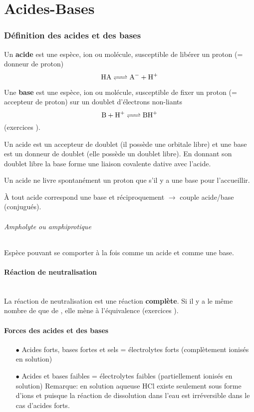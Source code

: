 \part{Acides-Bases}
\section{Définition des acides et des bases}



Un \textbf{acide} est une espèce,
ion ou molécule,
susceptible de libérer un proton  (= donneur de proton)
\[ \ce{HA <=> A- + H+} \]

Une \textbf{base} est une espèce, ion ou molécule,
susceptible de fixer un proton  (= accepteur de proton) sur un doublet d'électrons non-liants
\[ \ce{B + H+ <=> BH+} \]
(exercices \cite[p.~6]{godard}).

Un acide est un accepteur de doublet (il possède une orbitale libre) et une base est un donneur de doublet (elle possède un doublet libre).
En donnant son doublet libre la base forme une liaison covalente dative avec l'acide.

Un acide ne livre spontanément un proton que s'il y a une base pour l'accueillir.

À tout acide correspond une base et réciproquement $\rightarrow$ couple acide/base (conjugués).

\paragraph{Ampholyte ou amphiprotique}
Espèce pouvant se comporter à la fois comme un acide et comme une base.

\subsection{Réaction de neutralisation}

\\

La réaction de neutralisation est une réaction \textbf{complète}.
Si il y a le même nombre de  que de ,
elle mène à l'équivalence (exercices \cite[p.~4]{godard}).

\subsection{Forces des acides et des bases}

\begin{itemize}
  \item[$\bullet$] Acides forts,
    bases fortes et sels = électrolytes forts (complètement ionisés en solution)
  \item[$\bullet$] Acides et bases faibles = électrolytes faibles (partiellement ionisés en solution)
    Remarque: en solution aqueuse HCl existe seulement sous forme d'ions  et  puisque la réaction de dissolution dans l'eau est irréversible dans le cas d'acides forts.
\end{itemize}


